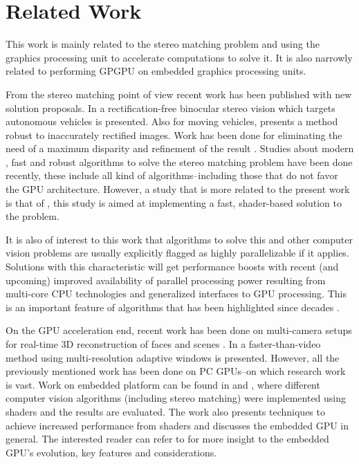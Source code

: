 \documentclass[conference]{IEEEtran}
\begin{document}

\section{Related Work}
This work is mainly related to the stereo matching problem and using the graphics processing unit to accelerate computations to solve it. It is also narrowly related to performing GPGPU on embedded graphics processing units.

From the stereo matching point of view recent work has been published with new solution proposals. In \cite{bin05} a rectification-free binocular stereo vision which targets autonomous vehicles is presented. Also for moving vehicles, \cite{unger11} presents a method robust to inaccurately rectified images. Work has been done for eliminating the need of a maximum disparity and refinement of the result \cite{unger09}. Studies about modern \cite{olofsson10}, fast and robust \cite{hong10} algorithms to solve the stereo matching problem have been done recently, these include all kind of algorithms--including those that do not favor the GPU architecture. However, a study that is more related to the present work is that of \cite{jonsson03}, this study is aimed at implementing a fast, shader-based solution to the problem.

It is also of interest to this work that algorithms to solve this and other computer vision problems are usually explicitly flagged as highly parallelizable if it applies. Solutions with this characteristic will get performance boosts with recent (and upcoming) improved availability of parallel processing power resulting from multi-core CPU technologies and generalized interfaces to GPU processing. This is an important feature of algorithms that has been highlighted since decades \cite{baker81}.

On the GPU acceleration end, recent work has been done on multi-camera setups for real-time 3D reconstruction of faces \cite{denker11} and scenes \cite{woetzel04}. In \cite{zhao11} a faster-than-video method using multi-resolution adaptive windows is presented. However, all the previously mentioned work has been done on PC GPUs--on which research work is vast. Work on embedded platform can be found in \cite{singhal10} and \cite{singhal12}, where different computer vision algorithms (including stereo matching) were implemented using shaders and the results are evaluated. The work also presents techniques to achieve increased performance from shaders and discusses the embedded GPU in general. The interested reader can refer to \cite{singhal12} for more insight to the embedded GPU's evolution, key features and considerations.
\end{document}
